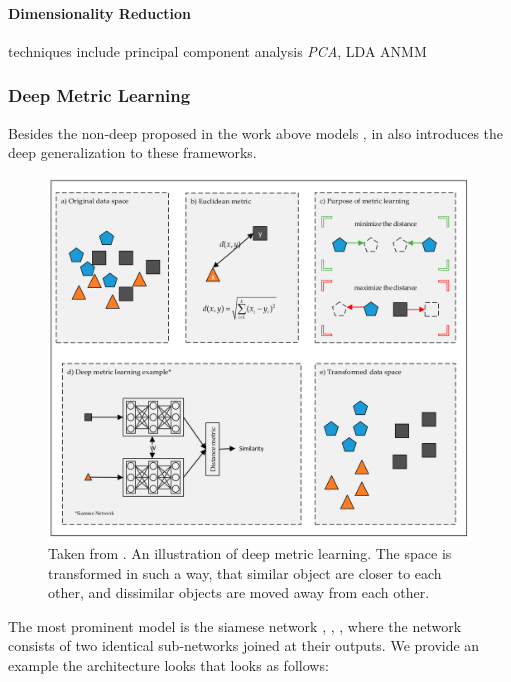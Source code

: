 \documentclass[a4paper,12pt,oneside,openright]{report}
\begin{document}
\paragraph{Dimensionality Reduction} techniques include principal component analysis \textit{PCA}, LDA ANMM



\subsubsection{Deep Metric Learning}

Besides the non-deep proposed in the work above models , in\cite{kaya19} also introduces the deep generalization to these frameworks.

\begin{figure}[H]
	\center
  \includegraphics[width=\linewidth]{./assets/relatedwork/metric_learning.png}
  \caption{Taken from \cite{kaya19}. An illustration of deep metric learning. The space is transformed in such a way, that similar object are closer to each other, and dissimilar objects are moved away from each other.}
  \label{fig:muse_translation}
\end{figure}

The most prominent model is the siamese network \cite{bromley94}, \cite{chopra05}, \cite{hadsell06}, where the network consists of two identical sub-networks joined at their outputs. 
We provide an example the architecture looks that looks as follows:
\end{document}
